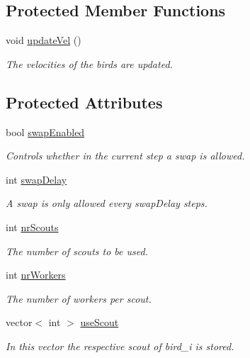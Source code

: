 \subsection*{Protected Member Functions}
\begin{CompactItemize}
\item 
void \hyperlink{classScoutSwarm_0a3e4d9f343702e42a6cb64349a25711}{updateVel} ()
\begin{CompactList}\small\item\em The velocities of the birds are updated. \item\end{CompactList}\end{CompactItemize}
\subsection*{Protected Attributes}
\begin{CompactItemize}
\item 
bool \hyperlink{classScoutSwarm_f68e3920742ea9b04176330a517f586f}{swapEnabled}
\begin{CompactList}\small\item\em Controls whether in the current step a swap is allowed. \item\end{CompactList}\item 
int \hyperlink{classScoutSwarm_337dd6e4974bfe13d02985c393657bf2}{swapDelay}
\begin{CompactList}\small\item\em A swap is only allowed every swapDelay steps. \item\end{CompactList}\item 
int \hyperlink{classScoutSwarm_7a55b74b3e6528d7f16ac9a65357d43c}{nrScouts}
\begin{CompactList}\small\item\em The number of scouts to be used. \item\end{CompactList}\item 
int \hyperlink{classScoutSwarm_83e2982030ed6a6b503b6f577edfdc09}{nrWorkers}
\begin{CompactList}\small\item\em The number of workers per scout. \item\end{CompactList}\item 
vector$<$ int $>$ \hyperlink{classScoutSwarm_150661cd2f47adf19273d8cc838e4b0c}{useScout}
\begin{CompactList}\small\item\em In this vector the respective scout of bird\_\-i is stored. \item\end{CompactList}\end{CompactItemize}


